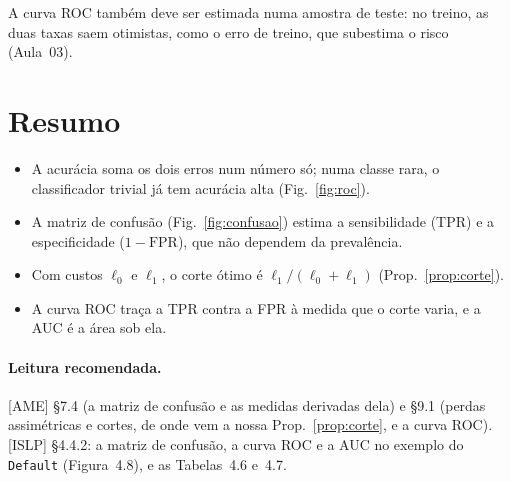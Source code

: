 \documentclass[11pt,a4paper]{article}
\begin{document}
\begin{atencao}
A curva ROC também deve ser estimada numa amostra de teste: no treino, as duas taxas
saem otimistas, como o erro de treino, que subestima o risco (Aula~03).
\end{atencao}

\section*{Resumo}
\begin{itemize}[leftmargin=1.4cm]
  \item A acurácia soma os dois erros num número só; numa classe rara, o classificador
        trivial já tem acurácia alta (Fig.~\ref{fig:roc}).
  \item A matriz de confusão (Fig.~\ref{fig:confusao}) estima a sensibilidade (TPR) e
        a especificidade ($1-\text{FPR}$), que não dependem da prevalência.
  \item Com custos $\ell_0$ e $\ell_1$, o corte ótimo é $\ell_1/(\ell_0+\ell_1)$
        (Prop.~\ref{prop:corte}).
  \item A curva ROC traça a TPR contra a FPR à medida que o corte varia, e a AUC é a
        área sob ela.
\end{itemize}

\paragraph{Leitura recomendada.} [AME] §7.4 (a matriz de confusão e as medidas
derivadas dela) e §9.1 (perdas assimétricas e cortes, de onde vem a nossa
Prop.~\ref{prop:corte}, e a curva ROC). [ISLP] §4.4.2: a matriz de confusão, a curva
ROC e a AUC no exemplo do \texttt{Default} (Figura~4.8), e as Tabelas~4.6 e~4.7.
\end{document}
